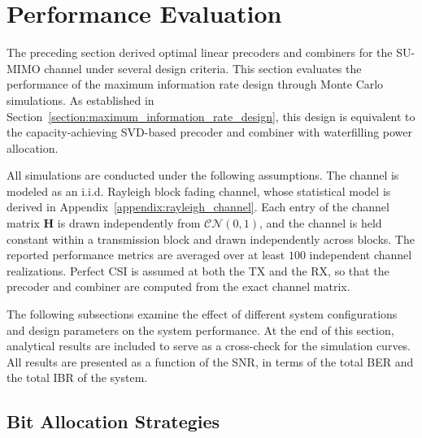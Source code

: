 \section{Performance Evaluation}
\label{section:performance_evaluation}

The preceding section derived optimal linear precoders and combiners for the \ac{SU}-\ac{MIMO} channel under several design criteria.
This section evaluates the performance of the maximum information rate design through Monte Carlo simulations.
As established in Section~\ref{section:maximum_information_rate_design}, this design is equivalent to the capacity-achieving \ac{SVD}-based precoder and combiner with waterfilling power allocation.

All simulations are conducted under the following assumptions.
The channel is modeled as an i.i.d. Rayleigh block fading channel, whose statistical model is derived in Appendix~\ref{appendix:rayleigh_channel}.
Each entry of the channel matrix $\mathbf{H}$ is drawn independently from $\mathcal{CN}(0,1)$, and the channel is held constant within a transmission block and drawn independently across blocks.
The reported performance metrics are averaged over at least $100$ independent channel realizations.
Perfect \ac{CSI} is assumed at both the \ac{TX} and the \ac{RX}, so that the precoder and combiner are computed from the exact channel matrix.

The following subsections examine the effect of different system configurations and design parameters on the system performance.
At the end of this section, analytical results are included to serve as a cross-check for the simulation curves.
All results are presented as a function of the \ac{SNR}, in terms of the total \acf{BER} and the total \acf{IBR} of the system.

\subsection{Bit Allocation Strategies}
\label{subsection:bit_allocation_strategies}

